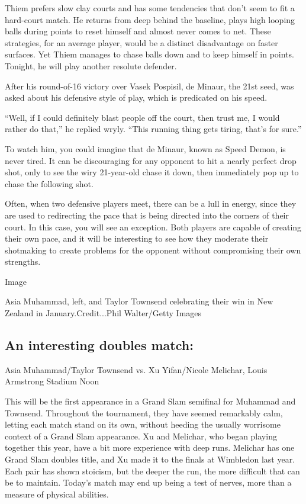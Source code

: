 Thiem prefers slow clay courts and has some tendencies that don't seem
to fit a hard-court match. He returns from deep behind the baseline,
plays high looping balls during points to reset himself and almost never
comes to net. These strategies, for an average player, would be a
distinct disadvantage on faster surfaces. Yet Thiem manages to chase
balls down and to keep himself in points. Tonight, he will play another
resolute defender.

After his round-of-16 victory over Vasek Pospisil, de Minaur, the 21st
seed, was asked about his defensive style of play, which is predicated
on his speed.

``Well, if I could definitely blast people off the court, then trust me,
I would rather do that,'' he replied wryly. ``This running thing gets
tiring, that's for sure.''

To watch him, you could imagine that de Minaur, known as Speed Demon, is
never tired. It can be discouraging for any opponent to hit a nearly
perfect drop shot, only to see the wiry 21-year-old chase it down, then
immediately pop up to chase the following shot.

Often, when two defensive players meet, there can be a lull in energy,
since they are used to redirecting the pace that is being directed into
the corners of their court. In this case, you will see an exception.
Both players are capable of creating their own pace, and it will be
interesting to see how they moderate their shotmaking to create problems
for the opponent without compromising their own strengths.

Image

Asia Muhammad, left, and Taylor Townsend celebrating their win in New
Zealand in January.Credit...Phil Walter/Getty Images

\hypertarget{an-interesting-doubles-match}{%
\subsection{An interesting doubles
match:}\label{an-interesting-doubles-match}}

Asia Muhammad/Taylor Townsend vs. Xu Yifan/Nicole Melichar, Louis
Armstrong Stadium \textbar{} Noon

This will be the first appearance in a Grand Slam semifinal for Muhammad
and Townsend. Throughout the tournament, they have seemed remarkably
calm, letting each match stand on its own, without heeding the usually
worrisome context of a Grand Slam appearance. Xu and Melichar, who began
playing together this year, have a bit more experience with deep runs.
Melichar has one Grand Slam doubles title, and Xu made it to the finals
at Wimbledon last year. Each pair has shown stoicism, but the deeper the
run, the more difficult that can be to maintain. Today's match may end
up being a test of nerves, more than a measure of physical abilities.

